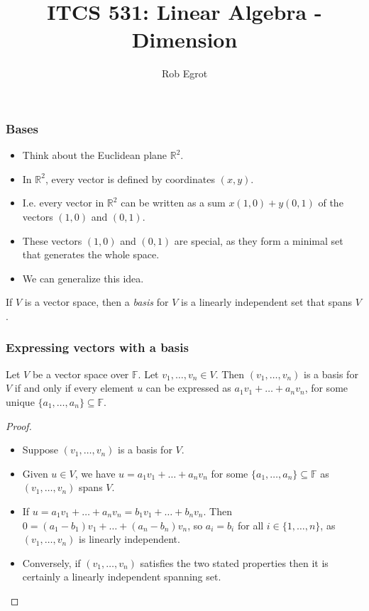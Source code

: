 \documentclass[handout]{beamer}
\title{ITCS 531: Linear Algebra - Dimension}
\date{}
\author{Rob Egrot}
\newcommand{\bR}{\mathbb{R}}
\newcommand{\bF}{\mathbb{F}}
\begin{document}
\begin{frame}
\titlepage
\end{frame}

\begin{frame}
\frametitle{Bases}
\begin{itemize}
\item Think about the Euclidean plane $\bR^2$. 
\item In $\bR^2$, every vector is defined by coordinates $(x,y)$.
\item I.e. every vector in $\bR^2$ can be written as a sum $x(1,0)+y(0,1)$ of the vectors $(1,0)$ and $(0,1)$.
\item These vectors $(1,0)$ and $(0,1)$ are special, as they form a minimal set that generates the whole space.
\item We can generalize this idea.
\end{itemize}
\begin{definition}
If $V$ is a vector space, then a \emph{basis} for $V$ is a linearly independent set that spans $V$.
\end{definition}
\end{frame}

\begin{frame}
\frametitle{Expressing vectors with a basis}
\begin{lemma}
Let $V$ be a vector space over $\bF$. Let $v_1,\ldots,v_n\in V$. Then $(v_1,\ldots,v_n)$ is a basis for $V$ if and only if every element $u$ can be expressed as $a_1v_1+\ldots + a_nv_n$, for some unique $\{a_1,\ldots,a_n\}\subseteq \bF$. 
\end{lemma}
\begin{proof}
\begin{itemize}
\item Suppose $(v_1,\ldots,v_n)$ is a basis for $V$. 
\item Given $u\in V$, we have $u= a_1v_1+\ldots + a_nv_n$ for some $\{a_1,\ldots,a_n\}\subseteq \bF$ as$(v_1,\ldots,v_n)$ spans $V$. 
\item If $u = a_1v_1+\ldots + a_nv_n = b_1v_1+\ldots + b_nv_n$. Then $0 = (a_1-b_1)v_1+\ldots +(a_n-b_n)v_n$, so $a_i=b_i$ for all $i\in \{1,\ldots,n\}$, as $(v_1,\ldots,v_n)$ is linearly independent.
\item Conversely, if $(v_1,\ldots,v_n)$ satisfies the two stated properties then it is certainly a linearly independent spanning set.
\end{itemize}
\end{proof}
\end{frame}
\end{document}
